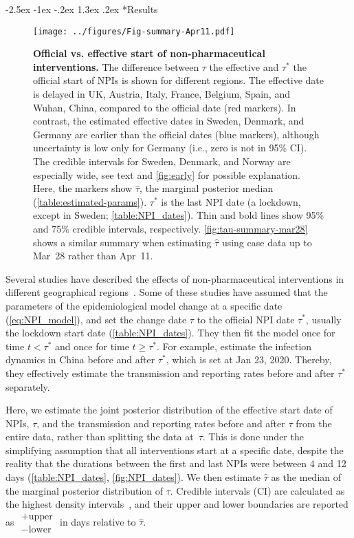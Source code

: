 \documentclass[12pt]{extarticle}
\makeatletter
\renewcommand\section{\@startsection {section}{1}{\z@}%
     {-2.5ex \@plus -1ex \@minus -.2ex}%
     {1.3ex \@plus.2ex}%
    {\Large\bfseries}}
\makeatother
\begin{document}
\section*{Results}


\begin{figure}[b!]
    \centering
	\texttt{[image: ../figures/Fig-summary-Apr11.pdf]}	
    \caption{
    \textbf{Official vs. effective start of non-pharmaceutical interventions.}
    	The difference between $\tau$ the effective and $\tau^*$ the official start of NPIs is shown for different regions. The effective date is delayed in UK, Austria, Italy, France, Belgium, Spain, and Wuhan, China, compared to the official date (red markers). In contrast, the estimated effective dates in Sweden, Denmark, and Germany are earlier than the official dates (blue markers), although uncertainty is low only for Germany (i.e., zero is not in 95\% CI). The credible intervals for Sweden, Denmark, and Norway are especially wide, see text and \autoref{fig:early} for possible explanation.
	Here, the markers show $\hat{\tau}$, the marginal posterior median (\autoref{table:estimated-params}). $\tau^*$ is the last NPI date (a lockdown, except in Sweden; \autoref{table:NPI_dates}). Thin and bold lines show 95\% and 75\% credible intervals, respectively. \autoref{fig:tau-summary-mar28} shows a similar summary when estimating $\hat{\tau}$ using case data up to Mar~28 rather than Apr~11.
    }
    \label{fig:tau-summary}
\end{figure}



Several studies have described the effects of non-pharmaceutical interventions in different geographical regions~\citep{Flaxman2020,Gatto2020,Li2020}. 
Some of these studies have assumed that the parameters of the epidemiological model change at a specific date (\autoref{eq:NPI_model}), and set the change date $\tau$ to the official NPI date $\tau^*$, usually the lockdown start date (\autoref{table:NPI_dates}).
They then fit the model once for time $t<\tau^*$ and once for time $t \ge \tau^*$.
For example, \citet{Li2020} estimate the infection dynamics in China before and after $\tau^*$, which is set at Jan 23, 2020. Thereby, they effectively estimate the transmission and reporting rates before and after $\tau^*$ separately.

Here, we estimate the joint posterior distribution of the effective start date of NPIs, $\tau$, and the transmission and reporting rates before and after $\tau$ from the entire data, rather than splitting the data at~$\tau$. 
This is done under the simplifying assumption that all interventions start at a specific date, despite the reality that the durations between the first and last NPIs were between 4 and 12 days (\autoref{table:NPI_dates}, \autoref{fig:NPI_dates}).
We then estimate $\hat{\tau}$ as the median of the marginal posterior distribution of $\tau$.
Credible intervals (CI) are calculated as the highest density intervals~\citep{Kruschke2015}, and their upper and lower boundaries are reported as $\substack{+\text{upper} \\ -\text{lower}}$ in days relative to $\hat{\tau}$.
\end{document}
